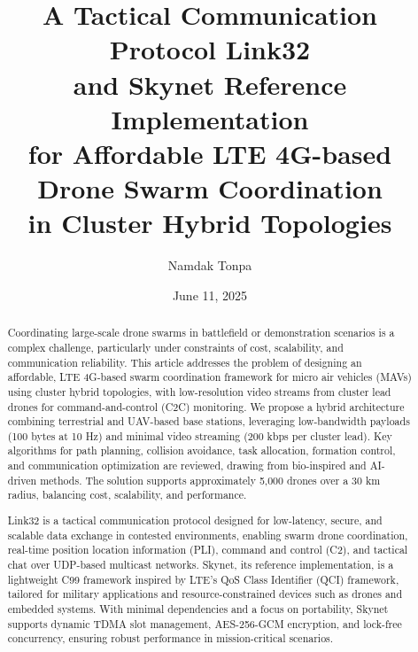 \documentclass{article}
\begin{document}
\title{A Tactical Communication Protocol Link32 \\
       and Skynet Reference Implementation \\
       for Affordable LTE 4G-based \\
       Drone Swarm Coordination \\
       in Cluster Hybrid Topologies}

\author{Namdak Tonpa}
\date{June 11, 2025}
\maketitle

\begin{abstract}
Coordinating large-scale drone swarms in battlefield or demonstration scenarios
is a complex challenge, particularly under constraints of cost, scalability,
and communication reliability. This article addresses the problem of designing an affordable,
LTE 4G-based swarm coordination framework for micro air vehicles (MAVs) using cluster hybrid
topologies, with low-resolution video streams from cluster lead drones for
command-and-control (C2C) monitoring. We propose a hybrid architecture combining
terrestrial and UAV-based base stations, leveraging low-bandwidth
payloads (100 bytes at 10 Hz) and minimal video streaming (200 kbps per cluster lead).
Key algorithms for path planning, collision avoidance, task allocation, formation control,
and communication optimization are reviewed, drawing from bio-inspired and AI-driven methods.
The solution supports approximately 5,000 drones over a 30 km radius, balancing cost,
scalability, and performance.

Link32 is a tactical communication protocol designed for low-latency, secure, and scalable data
exchange in contested environments, enabling swarm drone coordination, real-time position location
information (PLI), command and control (C2), and tactical chat over UDP-based multicast networks.
Skynet, its reference implementation, is a lightweight C99 framework inspired by LTE’s QoS Class
Identifier (QCI) framework, tailored for military applications and resource-constrained devices
such as drones and embedded systems. With minimal dependencies and a focus on portability, Skynet
supports dynamic TDMA slot management, AES-256-GCM encryption, and lock-free concurrency, ensuring
robust performance in mission-critical scenarios.
\end{abstract}

\newpage
\tableofcontents
\end{document}
